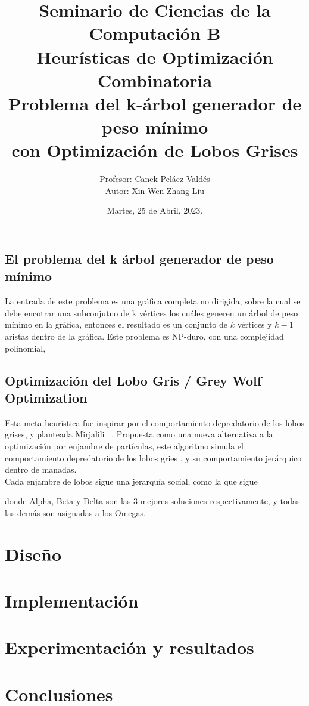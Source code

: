 \documentclass[a4paper]{article}
\title { \Large{Seminario de Ciencias de la Computaci\'on B}\protect\\
  \large{Heurísticas de Optimización Combinatoria}\protect\\
  \large{Problema del k-\'arbol generador de peso m\'inimo\\con Optimización de Lobos Grises}}
\date{\normalsize{Martes, 25 de Abril, 2023.}}
\author{\normalsize{Profesor: Canek Peláez Valdés}\protect\\
  \normalsize{Autor: Xin Wen Zhang Liu}}\vspace{0.2cm}
\begin{document}
\allowdisplaybreaks
\maketitle

\subsection*{El problema del k \'arbol generador de peso m\'inimo}
La entrada de este problema es una gr\'afica completa no dirigida, sobre la cual se debe encotrar una subconjutno de k v\'ertices los cu\'ales generen un \'arbol de peso m\'inimo en la gr\'afica, entonces el resultado es un conjunto de $k$ v\'ertices y $k-1$ aristas dentro de la gr\'afica. Este problema es NP-duro, con una complejidad polinomial, 


\subsection*{Optimizaci\'on del Lobo Gris / Grey Wolf Optimization}
Esta meta-heur\'istica fue inspirar por el comportamiento depredatorio de los lobos grises, y planteada Mirjalili
~\cite{MIRJALILI201446}. Propuesta como una nueva alternativa a la optimización por enjambre de
part\'iculas, este algoritmo simula el comportamiento depredatorio de los lobos gries , y su comportamiento jer\'arquico dentro de manadas.\\

Cada enjambre de lobos sigue una jerarqu\'ia social, como la que sigue


donde Alpha, Beta y Delta son las 3 mejores soluciones respectivamente, y todas las dem\'as son asignadas a los Omegas.




\section*{Diseño}


\section*{Implementaci\'on}




\section*{Experimentaci\'on y resultados}




\section*{Conclusiones}


{}

\end{document}
